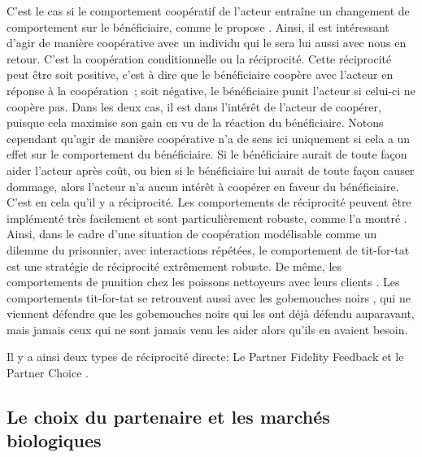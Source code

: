 C'est le cas si le comportement coopératif de l'acteur entraîne un changement de comportement sur le bénéficiaire, comme le propose \citet{Trivers1971}. Ainsi, il est intéressant d'agir de manière coopérative avec un individu qui le sera lui aussi avec nous en retour. C'est la coopération conditionnelle ou la réciprocité. Cette réciprocité peut être soit positive, c'est à dire que le bénéficiaire coopère avec l'acteur en réponse à la coopération ; soit négative, le bénéficiaire punit l'acteur si celui-ci ne coopère pas. Dans les deux cas, il est dans l'intérêt de l'acteur de coopérer, puisque cela maximise son gain en vu de la réaction du bénéficiaire. Notons cependant qu'agir de manière coopérative n'a de sens ici uniquement si cela a un effet sur le comportement du bénéficiaire. Si le bénéficiaire aurait de toute façon aider l'acteur après coût, ou bien si le bénéficiaire lui aurait de toute façon causer dommage, alors l'acteur n'a aucun intérêt à coopérer en faveur du bénéficiaire. C'est en cela qu'il y a réciprocité. Les comportements de réciprocité peuvent être implémenté très facilement et sont particulièrement robuste, comme l'a montré \citet{Axelrod1981}. Ainsi, dans le cadre d'une situation de coopération modélisable comme un dilemme du prisonnier, avec interactions répétées, le comportement de tit-for-tat est une stratégie de réciprocité extrêmement robuste. De même, les comportements de punition chez les poissons nettoyeurs avec leurs clients \citep{bsharyxx}. Les comportements tit-for-tat se retrouvent aussi avec les gobemouches noirs \citep{Krams2008}, qui ne viennent défendre que les gobemouches noirs qui les ont déjà défendu auparavant, mais jamais ceux qui ne sont jamais venu les aider alors qu'ils en avaient besoin.

Il y a ainsi deux types de réciprocité directe: Le Partner Fidelity Feedback et le Partner Choice \citep{Sachs2004}.

\subsection{Le choix du partenaire et les marchés biologiques}


